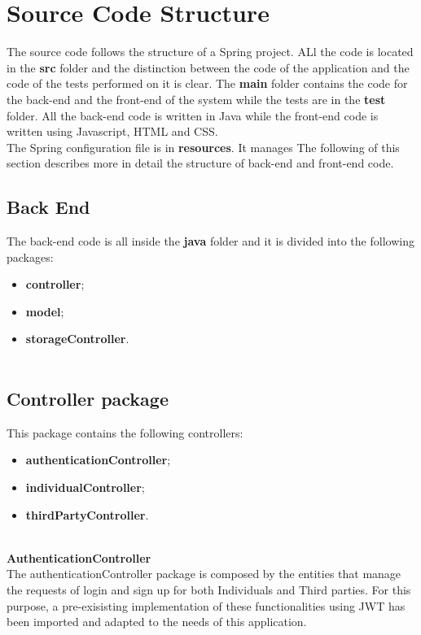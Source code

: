 \section{Source Code Structure}
The source code follows the structure of a Spring project. ALl the code is located in the \textbf{src} folder and the distinction between the code of the application and the code of the tests performed on it is clear. The \textbf{main} folder contains the code for the back-end and the front-end of the system while the tests are in the \textbf{test} folder. All the back-end code is written in Java while the front-end code is written using Javascript, HTML and CSS.\\
The Spring configuration file is in \textbf{resources}. It manages %
The following of this section describes more in detail the structure of back-end and front-end code.


\subsection{Back End}
The back-end code is all inside the \textbf{java} folder and it is divided into the following packages:
\begin{itemize}
	\item \textbf{controller};
	\item \textbf{model};
	\item \textbf{storageController}.\\\\
\end{itemize}

\subsection*{\textbf{Controller package}}
This package contains the following controllers:
\begin{itemize}
	\item \textbf{authenticationController};
	\item \textbf{individualController};
	\item \textbf{thirdPartyController}.\\\\
\end{itemize}
\textbf{AuthenticationController}\\
The authenticationController package is composed by the entities that manage the requests of login and sign up for both Individuals and Third parties. 
For this purpose, a pre-exisisting implementation of these functionalities using JWT has been imported and adapted to the needs of this application.\\

